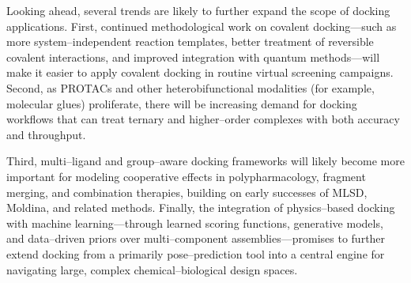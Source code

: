 \documentclass[12pt]{article}
\begin{document}
Looking ahead, several trends are likely to further expand the scope of docking applications.  
First, continued methodological work on covalent docking—such as more system–independent reaction templates, better treatment of reversible covalent interactions, and improved integration with quantum methods—will make it easier to apply covalent docking in routine virtual screening campaigns.\cite{CH14_CovalentDockingReview2015,CH14_CovalentToolSelection2019,CH14_HCovDock2023,CH14_CovCIFDock2025} 
Second, as PROTACs and other heterobifunctional modalities (for example, molecular glues) proliferate, there will be increasing demand for docking workflows that can treat ternary and higher–order complexes with both accuracy and throughput.\cite{CH14_Drummond2020,CH14_PRosettaC2020,CH14_flt3protac2025,CH14_megaprotac2025,CH14_PRosettaCAf3_2025} 

Third, multi–ligand and group–aware docking frameworks will likely become more important for modeling cooperative effects in polypharmacology, fragment merging, and combination therapies, building on early successes of MLSD, Moldina, and related methods.\cite{CH14_MLSD2010,CH14_Moldina2025,CH14_ErbB4MLSD2024,CH14_PapayaMultiLigand2025} 
Finally, the integration of physics–based docking with machine learning—through learned scoring functions, generative models, and data–driven priors over multi–component assemblies—promises to further extend docking from a primarily pose–prediction tool into a central engine for navigating large, complex chemical–biological design spaces.\cite{CH14_Smiles2Dock2024,CH14_GroupBind2025} 


\end{document}
